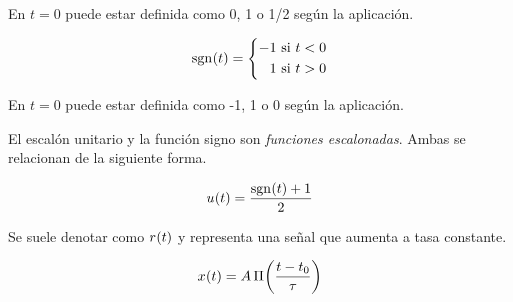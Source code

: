 En $t=0$ puede estar definida como 0, 1 o 1/2 según la aplicación.

\begin{center}
    \def\svgwidth{0.6\linewidth}
    
\end{center}


\begin{equation*}
    \fx[\sgn]{t} =
    \left\{
    \begin{aligned}
        -1 \text{ si $t<0$}
        \\
        1 \text{ si $t>0$}
    \end{aligned}
    \right.
\end{equation*}

En $t=0$ puede estar definida como -1, 1 o 0 según la aplicación.

\begin{center}
    \def\svgwidth{0.6\linewidth}
    
\end{center}

El escalón unitario y la función signo son \emph{funciones escalonadas}.
Ambas se relacionan de la siguiente forma.

\begin{mdframed}[style=PropertyFrame]
    \begin{prop}
    \end{prop}
    \begin{equation*}
        \fx[u]{t} = \frac{\fx[\sgn]{t} + 1}{2}
    \end{equation*}
\end{mdframed}


Se suele denotar como $\fx[r]{t}$ y representa una señal que aumenta a tasa constante.

\begin{center}
    \def\svgwidth{0.6\linewidth}
    
\end{center}


\begin{equation*}
    \fx[x]{t} = A \, \pulse[t_0]{t}{\tau}
\end{equation*}

\begin{center}
    \def\svgwidth{0.8\linewidth}
    
\end{center}

